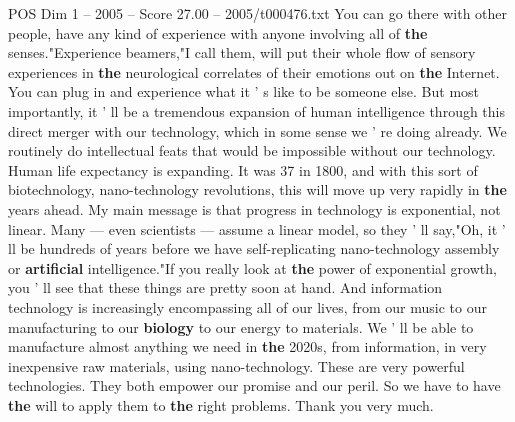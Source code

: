 \begin{textsample}{POS Dim 1 – 2005 – Score 27.00 – 2005/t000476.txt}
You can go there with other people, have any kind of experience with anyone involving all of \textbf{the} senses."Experience beamers,"I call them, will put their whole flow of sensory experiences in \textbf{the} neurological correlates of their emotions out on \textbf{the} Internet.
You can plug in and experience what it ' s like to be someone else.
But most importantly, it ' ll be a tremendous expansion of human intelligence through this direct merger with our technology, which in some sense we ' re doing already.
We routinely do intellectual feats that would be impossible without our technology.
Human life expectancy is expanding.
It was 37 in 1800, and with this sort of biotechnology, nano-technology revolutions, this will move up very rapidly in \textbf{the} years ahead.
My main message is that progress in technology is exponential, not linear.
Many — even scientists — assume a linear model, so they ' ll say,"Oh, it ' ll be hundreds of years before we have self-replicating nano-technology assembly or \textbf{artificial} intelligence."If you really look at \textbf{the} power of exponential growth, you ' ll see that these things are pretty soon at hand.
And information technology is increasingly encompassing all of our lives, from our music to our manufacturing to our \textbf{biology} to our energy to materials.
We ' ll be able to manufacture almost anything we need in \textbf{the} 2020s, from information, in very inexpensive raw materials, using nano-technology.
These are very powerful technologies.
They both empower our promise and our peril.
So we have to have \textbf{the} will to apply them to \textbf{the} right problems.
Thank you very much.

\end{textsample}
